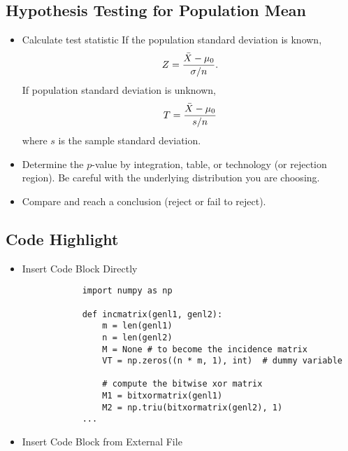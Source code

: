 \documentclass{article}
\begin{document}
    \subsection{Hypothesis Testing for Population Mean}
    \begin{itemize}
        \item Calculate test statistic
        If the population standard deviation is known,
        $$
        Z = \frac{\Bar{X} - \mu_0}{\sigma / n}.
        $$
        If population standard deviation is unknown,
        $$
        T = \frac{\Bar{X} - \mu_0}{s / n}
        $$
        where $s$ is the sample standard deviation.
        \item Determine the $p$-value by integration, table, or technology (or rejection region). Be careful with the underlying distribution you are choosing.
        \item Compare and reach a conclusion (reject or fail to reject).
    \end{itemize}
    
    \subsection{Code Highlight}
    \begin{itemize}
        \item Insert Code Block Directly
        \begin{verbatim}
            import numpy as np
                
            def incmatrix(genl1, genl2):
                m = len(genl1)
                n = len(genl2)
                M = None # to become the incidence matrix
                VT = np.zeros((n * m, 1), int)  # dummy variable
                
                # compute the bitwise xor matrix
                M1 = bitxormatrix(genl1)
                M2 = np.triu(bitxormatrix(genl2), 1) 
            ...
        \end{verbatim}
        \item Insert Code Block from External File
        \inputminted{python}{minted_example.py}
    \end{itemize}
    
\end{document}
